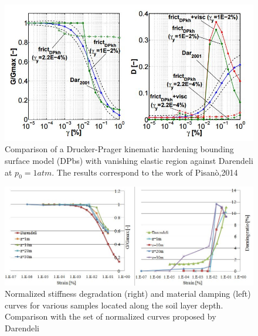 \documentclass[11pt,a4paper]{report}
\begin{document}
\begin{figure}[!h]
	\centering
	\includegraphics[width=0.9 \linewidth]{pisano}
	\caption{Comparison of a Drucker-Prager kinematic hardening bounding surface model (DPbs) with vanishing elastic region against Darendeli at $p_0=1 atm$. The results correspond to the work of Pisan\`{o},2014 \cite{pisano2014simulating}}
	\label{pisano}
\end{figure}

\begin{figure}[!h]
	\centering
	\includegraphics[width=0.9 \linewidth]{ggmax}
	\caption{Normalized stiffness degradation (right) and material damping (left) curves for various samples located along the soil layer depth. Comparison with the set of \mbox{normalized} curves proposed by Darendeli}
	\label{ggmaxi}
\end{figure}

\end{document}
